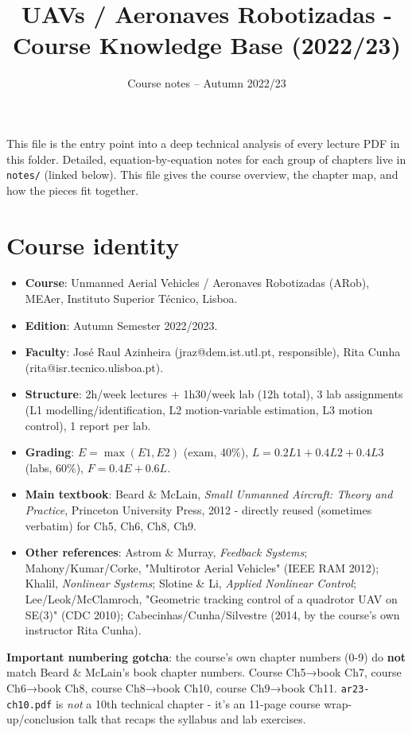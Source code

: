\documentclass[11pt]{article}
\title{UAVs / Aeronaves Robotizadas - Course Knowledge Base (2022/23)}
\author{Course notes -- Autumn 2022/23}
\date{}
\begin{document}
\maketitle
\tableofcontents
\vspace{1em}

This file is the entry point into a deep technical analysis of every lecture PDF in this folder.
Detailed, equation-by-equation notes for each group of chapters live in \texttt{notes/} (linked below).
This file gives the course overview, the chapter map, and how the pieces fit together.

\section{Course identity}

\begin{itemize}
\item \textbf{Course}: Unmanned Aerial Vehicles / Aeronaves Robotizadas (ARob), MEAer, Instituto Superior Técnico, Lisboa.
\item \textbf{Edition}: Autumn Semester 2022/2023.
\item \textbf{Faculty}: José Raul Azinheira (jraz@dem.ist.utl.pt, responsible), Rita Cunha (rita@isr.tecnico.ulisboa.pt).
\item \textbf{Structure}: 2h/week lectures + 1h30/week lab (12h total), 3 lab assignments (L1 modelling/identification, L2 motion-variable estimation, L3 motion control), 1 report per lab.
\item \textbf{Grading}: $E = \max(E1, E2)$ (exam, 40\%), $L = 0.2 L1 + 0.4 L2 + 0.4 L3$ (labs, 60\%), $F = 0.4 E + 0.6 L$.
\item \textbf{Main textbook}: Beard \& McLain, \textit{Small Unmanned Aircraft: Theory and Practice}, Princeton University Press, 2012 - directly reused (sometimes verbatim) for Ch5, Ch6, Ch8, Ch9.
\item \textbf{Other references}: Astrom \& Murray, \textit{Feedback Systems}; Mahony/Kumar/Corke, "Multirotor Aerial Vehicles" (IEEE RAM 2012); Khalil, \textit{Nonlinear Systems}; Slotine \& Li, \textit{Applied Nonlinear Control}; Lee/Leok/McClamroch, "Geometric tracking control of a quadrotor UAV on SE(3)" (CDC 2010); Cabecinhas/Cunha/Silvestre (2014, by the course's own instructor Rita Cunha).
\end{itemize}

\textbf{Important numbering gotcha}: the course's own chapter numbers (0-9) do \textbf{not} match Beard \& McLain's book chapter numbers. Course Ch5→book Ch7, course Ch6→book Ch8, course Ch8→book Ch10, course Ch9→book Ch11. \texttt{ar23-ch10.pdf} is \textit{not} a 10th technical chapter - it's an 11-page course wrap-up/conclusion talk that recaps the syllabus and lab exercises.
\end{document}
